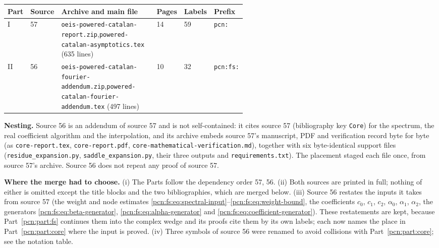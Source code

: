 \documentclass[11pt,letterpaper]{article}
\theoremstyle{remark}\newtheorem{remark}[theorem]{Remark}
\begin{document}
\begin{center}
\footnotesize\setlength{\tabcolsep}{4pt}
\begin{tabular}{@{}llp{0.55\linewidth}lll@{}}
\toprule
Part & Source & Archive and main file & Pages & Labels & Prefix\\
\midrule
I & 57 & \texttt{oeis-powered-catalan-report.zip},\newline \texttt{powered-catalan-asymptotics.tex} (635 lines) & 14 & 59 & \texttt{pcn:}\\
II & 56 & \texttt{oeis-powered-catalan-fourier-addendum.zip},\newline \texttt{powered-catalan-fourier-addendum.tex} (497 lines) & 10 & 32 & \texttt{pcn:fs:}\\
\bottomrule
\end{tabular}
\end{center}

\noindent\textbf{Nesting.} Source 56 is an addendum of source 57 and is not self-contained: it cites source 57 (bibliography key \texttt{Core}) for the spectrum, the real coefficient algorithm and the interpolation, and its archive embeds source 57's manuscript, PDF and verification record byte for byte (as \texttt{core-report.tex}, \texttt{core-report.pdf}, \texttt{core-mathematical-verification.md}), together with six byte-identical support files (\texttt{residue\_expansion.py}, \texttt{saddle\_expansion.py}, their three outputs and \texttt{requirements.txt}). The placement staged each file once, from source 57's archive. Source 56 does not repeat any proof of source 57.

\noindent\textbf{Where the merge had to choose.} (i) The Parts follow the dependency order 57, 56. (ii) Both sources are printed in full; nothing of either is omitted except the title blocks and the two bibliographies, which are merged below. (iii) Source 56 restates the inputs it takes from source 57 (the weight and node estimates \eqref{pcn:fs:eq:spectral-input}--\eqref{pcn:fs:eq:weight-bound}, the coefficients $c_0$, $c_1$, $c_2$, $\alpha_0$, $\alpha_1$, $\alpha_2$, the generators \eqref{pcn:fs:eq:beta-generator}, \eqref{pcn:fs:eq:alpha-generator} and \eqref{pcn:fs:eq:coefficient-generator}). These restatements are kept, because Part~\ref{pcn:part:fs} continues them into the complex wedge and its proofs cite them by its own labels; each now names the place in Part~\ref{pcn:part:core} where the input is proved. (iv) Three symbols of source 56 were renamed to avoid collisions with Part~\ref{pcn:part:core}; see the notation table.
\end{document}
